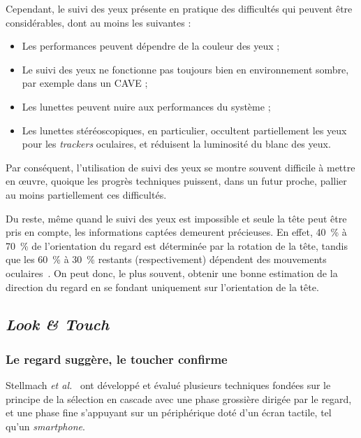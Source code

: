 	Cependant, le suivi des yeux présente en pratique des difficultés qui peuvent être considérables, dont au moins les suivantes :
	
	\begin{itemize}
		\item Les performances peuvent dépendre de la couleur des yeux ;
		\item Le suivi des yeux ne fonctionne pas toujours bien en environnement sombre, par exemple dans un CAVE ;
		\item Les lunettes peuvent nuire aux performances du système ;
		\item Les lunettes stéréoscopiques, en particulier, occultent partiellement les yeux pour les \emph{trackers} oculaires, et réduisent la luminosité du blanc des yeux.
	\end{itemize}

	Par conséquent, l'utilisation de suivi des yeux se montre souvent difficile à mettre en œuvre, quoique les progrès techniques puissent, dans un futur proche, pallier au moins partiellement ces difficultés.
	
	Du reste, même quand le suivi des yeux est impossible et seule la tête peut être pris en compte, les informations captées demeurent précieuses. En effet, 40~\%{} à 70~\%{} de l'orientation du regard est déterminée par la rotation de la tête, tandis que les 60~\%{} à 30~\%{} restants (respectivement) dépendent des mouvements oculaires~\cite{gauthier1991short}. On peut donc, le plus souvent, obtenir une bonne estimation de la direction du regard en se fondant uniquement sur l'orientation de la tête.
	
	\subsection{\emph{Look \&{} Touch}}
	\subsubsection{Le regard suggère, le toucher confirme}
	Stellmach \emph{et al.}~\cite{stellmach2012look} ont développé et évalué plusieurs techniques fondées sur le principe de la sélection en cascade avec une phase grossière dirigée par le regard, et une phase fine s'appuyant sur un périphérique doté d'un écran tactile, tel qu'un \emph{smartphone}.
	

